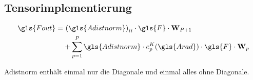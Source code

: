 \subsection{Tensorimplementierung}

\begin{equation}
\begin{split}
  \gls{Fout} = & \ {\left(\gls{Adistnorm}\right)}_{ii} \cdot \gls{F} \cdot \ma{W}_{P+1}\\
  & + \sum_{p=1}^P \gls{Adistnorm} \cdot e^K_p\left(\gls{Arad}\right) \cdot \gls{F} \cdot \ma{W}_{p}
\end{split}
\end{equation}

\gls{Adistnorm} enthält einmal nur die Diagonale und einmal alles ohne Diagonale.

\newpage
